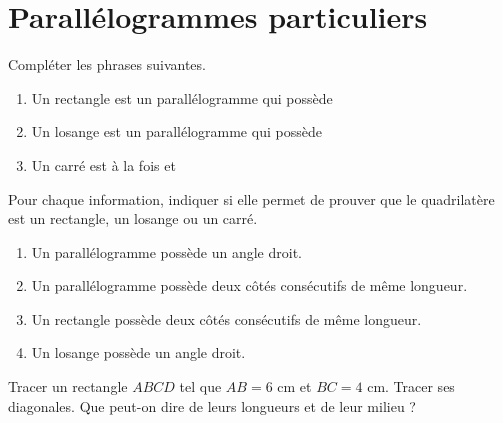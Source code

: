 \documentclass[a4paper,10pt]{report}
\begin{document}
\pagestyle{empty}
\section*{Parallélogrammes particuliers}

\begin{ex}
Compléter les phrases suivantes.
\begin{enumerate}
\item Un rectangle est un parallélogramme qui possède \dotfill
\item Un losange est un parallélogramme qui possède \dotfill
\item Un carré est à la fois \dotfill{} et \dotfill
\end{enumerate}
\end{ex}

\begin{ex}
Pour chaque information, indiquer si elle permet de prouver que le quadrilatère est un rectangle, un losange ou un carré.
\begin{enumerate}
\item Un parallélogramme possède un angle droit.
\item Un parallélogramme possède deux côtés consécutifs de même longueur.
\item Un rectangle possède deux côtés consécutifs de même longueur.
\item Un losange possède un angle droit.
\end{enumerate}
\end{ex}

\begin{ex}
Tracer un rectangle $ABCD$ tel que $AB=6$ cm et $BC=4$ cm. Tracer ses diagonales.
Que peut-on dire de leurs longueurs et de leur milieu ?

\noindent\grandscarreaux{\linewidth}{5cm}
\end{ex}
\end{document}
